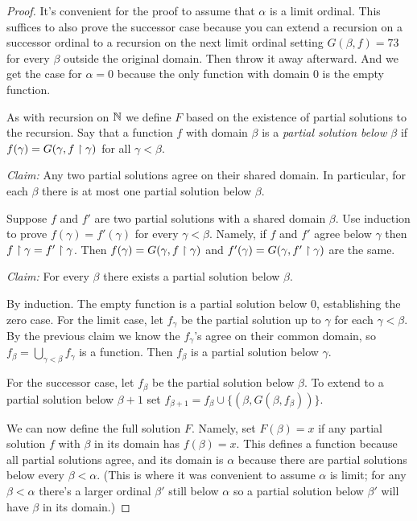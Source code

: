 \documentclass[10pt]{amsart}
\begin{document}
\begin{proof}
It's convenient for the proof to assume that $\alpha$ is a limit ordinal. This suffices to also prove the successor case because you can extend a recursion on a successor ordinal to a recursion on the next limit ordinal setting $G(\beta,f) = 73$ for every $\beta$ outside the original domain. Then throw it away afterward. And we get the case for $\alpha = 0$ because the only function with domain $0$ is the empty function.

As with recursion on $\mathbb{N}$ we define $F$ based on the existence of partial solutions to the recursion. Say that a function $f$ with domain $\beta$ is a \emph{partial solution below  $\beta$} if $f(\gamma) = G(\gamma, f \upharpoonright \gamma)$ for all $\gamma < \beta$.

\textit{Claim:} Any two partial solutions agree on their shared domain. In particular, for each $\beta$ there is at most one partial solution below $\beta$.

Suppose $f$ and $f'$ are two partial solutions with a shared domain $\beta$. Use induction to prove $f(\gamma) = f'(\gamma)$ for every $\gamma < \beta$. Namely, if $f$ and $f'$ agree below $\gamma$ then $f \upharpoonright \gamma = f' \upharpoonright \gamma$. Then $f(\gamma) = G(\gamma, f \upharpoonright \gamma)$ and $f'(\gamma) = G(\gamma, f' \upharpoonright \gamma)$ are the same.

\textit{Claim:} For every $\beta$ there exists a partial solution below $\beta$.

By induction. The empty function is a partial solution below $0$, establishing the zero case. For the limit case, let $f_\gamma$ be the partial solution up to $\gamma$ for each $\gamma < \beta$. By the previous claim we know the $f_\gamma$'s agree on their common domain, so $f_\beta = \bigcup_{\gamma < \beta} f_\gamma$ is a function. Then $f_\beta$ is a partial solution below $\gamma$.

For the successor case, let $f_\beta$ be the partial solution below $\beta$. To extend to a partial solution below $\beta+1$ set $f_{\beta + 1} = f_\beta \cup \{(\beta,G(\beta, f_\beta))\}$.

We can now define the full solution $F$. Namely, set $F(\beta) = x$ if any partial solution $f$ with $\beta$ in its domain has $f(\beta) = x$. This defines a function because all partial solutions agree, and its domain is $\alpha$ because there are partial solutions below every $\beta < \alpha$. (This is where it was convenient to assume $\alpha$ is limit; for any $\beta < \alpha$ there's a larger ordinal $\beta'$ still below $\alpha$ so a partial solution below $\beta'$ will have $\beta$ in its domain.)
\end{proof}
\end{document}
